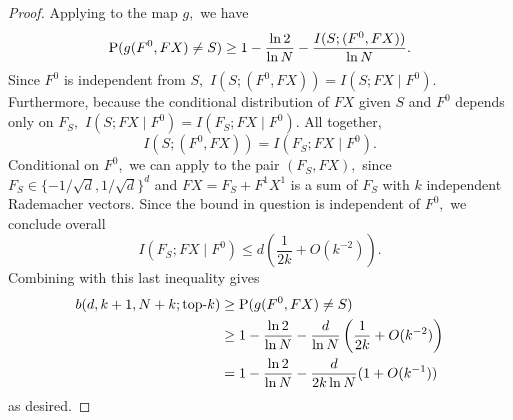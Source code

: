 \begin{proof}
Applying  to the map $g,$ we have
\begin{equation}
\operatorname{P}(g(F^0, FX) \neq S) \ge 1 - \frac{\ln 2}{\ln N} - \frac{I(S; (F^0, FX))}{\ln N}. \label{eq:failure-bound}
\end{equation}
Since $F^0$ is independent from $S,$ $I(S; (F^0, FX)) = I(S; FX \mid F^0).$ Furthermore, because the conditional distribution of $FX$ given $S$ and $F^0$ depends only on $F_S,$ $I(S; F X \mid F^0) = I(F_S; F X \mid F^0).$ All together,
$$
I(S; (F^0, FX)) =  I(F_S; FX \mid F^0).
$$
Conditional on $F^0,$ we can apply  to the pair $(F_S, FX),$ since $F_S \in \{-1/\sqrt{d}, 1/\sqrt{d} \}^d$ and $FX = F_S + F^1 X^1$ is a sum of $F_S$ with $k$ independent Rademacher vectors. Since the bound in question is independent of $F^0,$ we conclude overall
$$
I(F_S; F X \mid F^0) \le d \left(\frac 1 {2 k} + O(k^{-2})\right).
$$
Combining  with this last inequality gives
\begin{align*}
b(d, k + 1, N + k; \text{top-}k) & \ge \operatorname{P}(g(F^0, FX) \neq S) \\
& \ge 1 - \frac{\ln 2}{\ln N} - \frac{d}{\ln N} \left( \frac 1 {2 k} + O(k^{-2}) \right) \\
& = 1 - \frac{\ln 2}{\ln N} - \frac{d}{2 k \ln N} (1 + O(k^{-1}))
\end{align*}
as desired.
\end{proof}
